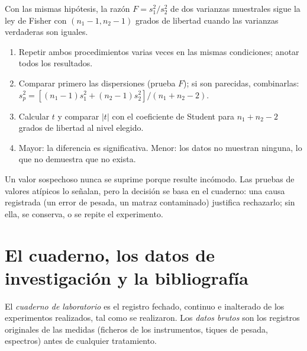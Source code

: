 \begin{proposition}[Prueba $F$]\label{prop:b3:lab-techniques-3:f-test}
Con las mismas hipótesis, la razón $F = s_1^2/s_2^2$ de dos varianzas muestrales sigue
la ley de Fisher con $(n_1 - 1, n_2 - 1)$ grados de libertad cuando las varianzas verdaderas son iguales.
\admitted
\end{proposition}

\begin{method}\label{met:b3:lab-techniques-3:compare-means}
\begin{enumerate}
  \item Repetir ambos procedimientos varias veces en las mismas condiciones; anotar
        todos los resultados.
  \item Comparar primero las dispersiones (prueba $F$); si son parecidas, combinarlas:
        $s_p^2 = [(n_1 - 1)s_1^2 + (n_2 - 1)s_2^2]/(n_1 + n_2 - 2)$.
  \item Calcular $t$ y comparar $|t|$ con el coeficiente de Student para $n_1 + n_2 - 2$ grados de
        libertad al nivel elegido.
  \item Mayor: la diferencia es significativa. Menor: los datos no muestran ninguna,
        lo que no demuestra que no exista.
\end{enumerate}
\end{method}

Un valor sospechoso nunca se suprime porque resulte incómodo. Las pruebas de valores atípicos
lo señalan, pero la decisión se basa en el cuaderno: una causa registrada (un error de
pesada, un matraz contaminado) justifica rechazarlo; sin ella, se conserva,
o se repite el experimento.

\section{El cuaderno, los datos de investigación y la bibliografía}

\begin{definition}\label{def:b3:lab-techniques-3:notebook}
El \emph{cuaderno de laboratorio} es el registro fechado,
continuo e inalterado de los experimentos realizados, tal como se realizaron. Los \emph{datos
brutos} son los registros originales de las medidas (ficheros de los
instrumentos, tiques de pesada, espectros) antes de cualquier tratamiento.
\end{definition}

